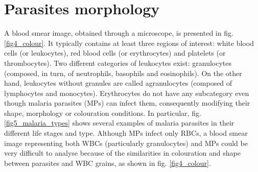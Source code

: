 \documentclass[final,a4paper,12pt,english]{UnicaPhdThesis3}
\begin{document}
\section{Parasites morphology}
A blood smear image, obtained through a microscope, is presented in fig. \ref{fig4_colour}. It typically contains at least three regions of interest: white blood cells (or leukocytes), red blood cells (or erythrocytes) and platelets (or thrombocytes). Two different categories of leukocytes exist: granulocytes (composed, in turn, of neutrophils, basophils and eosinophils). On the other hand, leukocytes without granules are called agranulocytes (composed of lymphocytes and monocytes). Erythrocytes do not have any subcategory even though malaria parasites (MPs) can infect them, consequently modifying their shape, morphology or colouration conditions. In particular, fig. \ref{fig5_malaria_types} shows several examples of malaria parasites in their different life stages and type.
Although MPs infect only RBCs, a blood smear image representing both WBCs (particularly granulocytes) and MPs could be very difficult to analyse because of the similarities in colouration and shape between parasites and WBC grains, as shown in fig. \ref{fig4_colour}.
\end{document}
